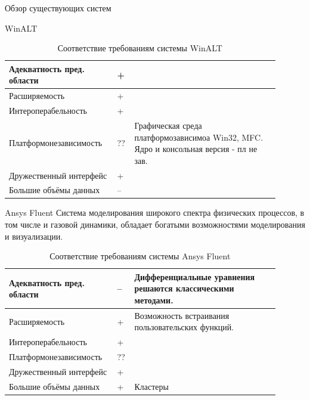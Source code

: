 \documentclass[a4paper,12pt]{extarticle}
\begin{document}
\begin{section}{Обзор существующих систем}
\begin{subsection}{WinALT}
    \begin{table}[h]
        \caption{Соответствие требованиям системы WinALT}
        \label{tabular:winalt}
        \begin{center}
            \begin{tabular}{|p{0.35\linewidth}|p{0.05\linewidth}|p{0.5\linewidth}|} \hline
                Адекватность пред. области & + & \\ \hline
                Расширяемость              & + & \\ \hline
                Интероперабельность        & + & \\ \hline
                Платформонезависимость     & ?? & Графическая среда платформозависимоа Win32, MFC. Ядро и консольная версия - пл не зав. \\ \hline
                Дружественный интерфейс    & + & \\ \hline
                Большие объёмы данных      & -- & \\ \hline
            \end{tabular}
        \end{center}
    \end{table}
\end{subsection}

\begin{subsection}{Ansys Fluent}
    Система моделирования широкого спектра физических процессов, в том числе и газовой динамики, обладает богатыми возможностями моделирования и визуализации.

    \begin{table}[h]
        \caption{Соответствие требованиям системы Ansys Fluent}
        \label{tabular:ansysfluent}
        \begin{center}
            \begin{tabular}{|p{0.35\linewidth}|p{0.05\linewidth}|p{0.5\linewidth}|} \hline
                Адекватность пред. области & -- & Дифференциальные уравнения решаются классическими методами. \\ \hline
                Расширяемость              & + & Возможность встраивания пользовательских функций. \\ \hline
                Интероперабельность        & + & \\ \hline
                Платформонезависимость     & ?? & \\ \hline
                Дружественный интерфейс    & + & \\ \hline
                Большие объёмы данных      & + & Кластеры \\ \hline
            \end{tabular}
        \end{center}
    \end{table}
\end{subsection}


\end{section}
\end{document}
